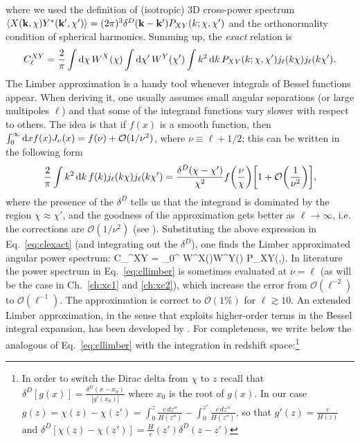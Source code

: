 %
where we used the definition of (isotropic) 3D cross-power spectrum $\langle X(\mathbf{k}, \chi) Y^*(\mathbf{k'}, \chi')\rangle= (2\pi)^3\delta^D(\mathbf{k}-\mathbf{k}')P_{XY}(k;\chi,\chi')$ and the orthonormality condition of spherical harmonics. Summing up, the \emph{exact} relation is
%
\begin{equation}
\label{eq:clexact}
C_{\ell}^{XY} = \frac{2}{\pi}\int \mathop{}\!\mathrm{d}\chi\, W^X(\chi)\int \mathop{}\!\mathrm{d}\chi'\, W^Y(\chi')\int k^2\mathop{}\!\mathrm{d} k\,  P_{XY}(k;\chi,\chi') j_{\ell}(k\chi)j_{\ell}(k\chi').
\end{equation}
% 
The Limber approximation \citep{Limber1953a} is a handy tool whenever integrals of Bessel functions appear.
When deriving it, one usually assumes small angular separations (or large multipoles $\ell$) and that some of the integrand functions vary slower with respect to others. The idea is that if $f(x)$ is a smooth function, then $\int_0^{\infty} \mathop{}\!\mathrm{d} x f(x)J_{\nu}(x) = f(\nu) + \mathcal{O}(1/\nu^2)$, where $\nu \equiv \ell + 1/2$; this can be written in the following form
%
\begin{equation}
\frac{2}{\pi}\int k^2\mathop{}\!\mathrm{d} k\, f(k) j_{\ell}(k\chi)j_{\ell}(k\chi') = \frac{\delta^D(\chi-\chi')}{\chi^2} f\biggl(\frac{\nu}{\chi}\biggr)\biggl[1+\mathcal{O}\biggl(\frac{1}{\nu^2}\biggr)\biggr],
\end{equation}
%
where the presence of the $\delta^D$ tells us that the integrand is dominated by the region $\chi \approx \chi'$, and the goodness of the approximation gets better as $\ell\to\infty$, i.e. the corrections are $\mathcal{O}(1/\nu^2)$ (see \citet{LoVerde2007}).
Substituting the above expression in Eq.~\eqref{eq:clexact} (and integrating out the $\delta^D$), one finds the Limber approximated angular power spectrum:
%
\be
\label{eq:cllimber}
C_{\ell}^{XY} = \int_0^{\infty} W^X(\chi)W^Y(\chi) P_{XY}\Biggl(,\chi\Biggr). 
\ee
%
In literature the power spectrum in Eq.~\eqref{eq:cllimber} is sometimes evaluated at $\nu = \ell$ (as will be the case in Ch.~\eqref{ch:xc1} and \eqref{ch:xc2}), which increase the error from $\mathcal{O}(\ell^{-2})$ to $\mathcal{O}(\ell^{-1})$. The approximation is correct to $\mathcal{O}(1\%)$ for $\ell \gtrsim 10$. An extended Limber approximation, in the sense that exploits higher-order terms in the Bessel integral expansion, has been developed by \citet{LoVerde2007}. For completeness, we write below the analogous of Eq.~\eqref{eq:cllimber} with the integration in redshift space:\footnote{In order to switch the Dirac delta from $\chi$ to $z$ recall that $\delta^D[g(x)]=\frac{\delta^D(x-x_0)}{|g'(x_0)|}$ where $x_0$ is the root of $g(x)$. In our case $g(z)=\chi(z)-\chi(z')=\int_0^z\frac{c\,dz''}{H(z'')}-\int_0^{z'}\frac{c\,dz''}{H(z'')}$, so that $g'(z)=\frac{c}{H(z)}$ and $\delta^D[\chi(z)-\chi(z')] = \frac{H}{c}(z')\delta^D(z-z')$}
